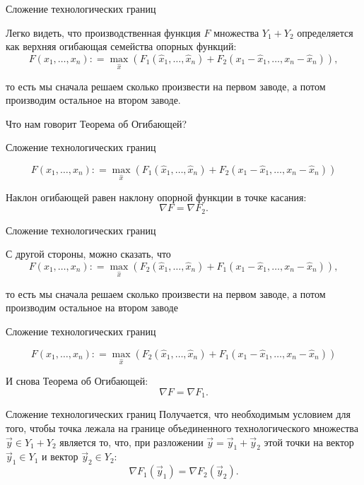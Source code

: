 \documentclass{beamer}
\begin{document}
\begin{frame}{Сложение технологических границ}

Легко видеть, что производственная функция $F$ множества $Y_1 + Y_2$ определяется как верхняя огибающая семейства опорных функций: $$F(x_1, \ldots, x_n) : = \max_{\hat x} \left(F_1(\hat x_1, \ldots, \hat x_n) + F_2(x_1 - \hat x_1, \ldots, x_n - \hat x_n)\right),$$

то есть мы сначала решаем сколько произвести на первом заводе, а потом производим остальное на втором заводе. 

Что нам говорит Теорема об Огибающей?

\end{frame}

\begin{frame}{Сложение технологических границ}

$$F(x_1, \ldots, x_n) : = \max_{\hat x} \left(F_1(\hat x_1, \ldots, \hat x_n) + F_2(x_1 - \hat x_1, \ldots, x_n - \hat x_n)\right)$$

Наклон огибающей равен наклону опорной функции в точке касания:
$$ \nabla F = \nabla F_2.$$

\end{frame}

\begin{frame}{Сложение технологических границ}

С другой стороны, можно сказать, что
$$F(x_1, \ldots, x_n) : = \max_{\hat x} \left(F_2(\hat x_1, \ldots, \hat x_n) + F_1(x_1 - \hat x_1, \ldots, x_n - \hat x_n)\right),$$

то есть мы сначала решаем сколько произвести на первом заводе, а потом производим остальное на втором заводе

\end{frame}

\begin{frame}{Сложение технологических границ}

$$F(x_1, \ldots, x_n) : = \max_{\hat x} \left(F_2(\hat x_1, \ldots, \hat x_n) + F_1(x_1 - \hat x_1, \ldots, x_n - \hat x_n)\right)$$

И снова Теорема об Огибающей:
$$ \nabla F = \nabla F_1.$$

\end{frame}

\begin{frame}{Сложение технологических границ}
Получается, что необходимым условием для того, чтобы точка лежала на границе объединенного технологического множества $\vec y \in Y_1 + Y_2$ является то, что, при разложении $\vec y = \vec y_1 + \vec y_2$ этой точки на вектор $\vec y_1 \in Y_1$ и вектор $\vec y_2 \in Y_2$:
$$ \nabla F_1(\vec y_1) =  \nabla F_2(\vec y_2).$$

\end{frame}
\end{document}
